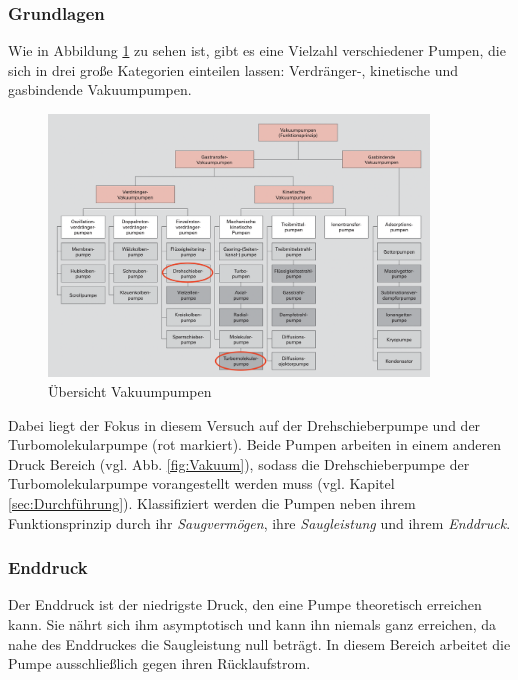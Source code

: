 \subsubsection{Grundlagen}
Wie in Abbildung \ref{fig:pumpen} zu sehen ist, gibt es eine Vielzahl verschiedener Pumpen,
die sich in drei große Kategorien einteilen lassen:
Verdränger-, kinetische und gasbindende Vakuumpumpen.
\begin{figure}[h]
    \centering
    \includegraphics[width=0.9\textwidth]{abb/pumpen.png}
    \caption{Übersicht Vakuumpumpen\cite{Pfeifer}} 
    \label{fig:pumpen}
\end{figure} 
Dabei liegt der Fokus in diesem Versuch auf der Drehschieberpumpe und der Turbomolekularpumpe (rot markiert).
Beide Pumpen arbeiten in einem anderen Druck Bereich (vgl. Abb. \ref{fig:Vakuum}), 
sodass die Drehschieberpumpe der Turbomolekularpumpe vorangestellt werden muss (vgl. Kapitel \ref{sec:Durchführung}).
Klassifiziert werden die Pumpen neben ihrem Funktionsprinzip durch ihr \textit{Saugvermögen}, ihre
\textit{Saugleistung} und ihrem \textit{Enddruck}.

\subsubsection{Enddruck}
Der Enddruck ist der niedrigste Druck, den eine Pumpe theoretisch erreichen kann.
Sie nährt sich ihm asymptotisch und kann ihn niemals ganz erreichen,
da nahe des Enddruckes die Saugleistung null beträgt.
In diesem Bereich arbeitet die Pumpe ausschließlich gegen ihren Rücklaufstrom.

